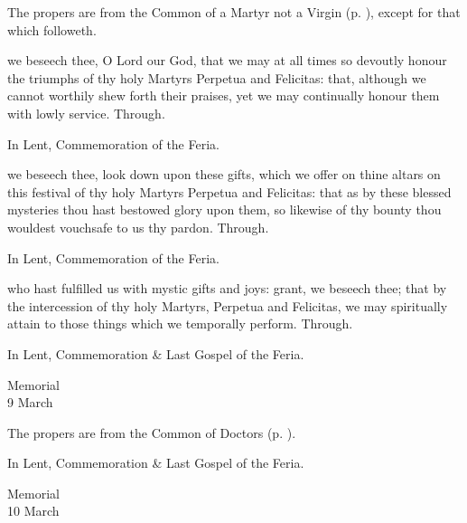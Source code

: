 \begin{rubric}
	The propers are from the Common of a Martyr not a Virgin (p. \pageref{CommonMartyrNotVirgin}), except for that which followeth.
\end{rubric}

\collect
{} we beseech thee, O Lord our God, that we may at all times so devoutly honour the triumphs of thy holy Martyrs Perpetua and Felicitas: that, although we cannot worthily shew forth their praises, yet we may continually honour them with lowly service. Through.

\begin{rubric}
	In Lent, Commemoration of the Feria.
\end{rubric}

\secret
{} we beseech thee, look down upon these gifts, which we offer on thine altars on this festival of thy holy Martyrs Perpetua and Felicitas: that as by these blessed mysteries thou hast bestowed glory upon them, so likewise of thy bounty thou wouldest vouchsafe to us thy pardon. Through.

\begin{rubric}
	In Lent, Commemoration of the Feria.
\end{rubric}

\postcommunion
{} who hast fulfilled us with mystic gifts and joys: grant, we beseech thee; that by the intercession of thy holy Martyrs, Perpetua and Felicitas, we may spiritually attain to those things which we temporally perform. Through.

\begin{rubric}
	In Lent, Commemoration \& Last Gospel of the Feria.
\end{rubric}


\begin{inhead}
    {Memorial\\
9 March}
\end{inhead}

\begin{rubric}
	The propers are from the Common of Doctors (p. \pageref{CommonDoctors}).
\end{rubric}
\begin{rubric}
	In Lent, Commemoration \& Last Gospel of the Feria.
\end{rubric}


\begin{inhead}
    {Memorial\\
10 March}
\end{inhead}

